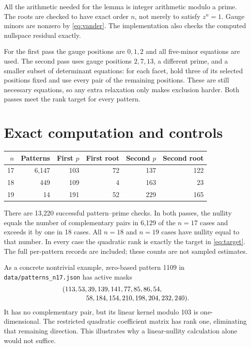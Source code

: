 \documentclass[11pt]{article}
\theoremstyle{definition}
\begin{document}
All the arithmetic needed for the lemma is integer arithmetic modulo a prime. The roots are checked to have exact order $n$, not merely to satisfy $z^n=1$. Gauge minors are nonzero by \eqref{eq:vander}. The implementation also checks the computed nullspace residual exactly.

For the first pass the gauge positions are $0,1,2$ and all five-minor equations are used. The second pass uses gauge positions $2,7,13$, a different prime, and a smaller subset of determinant equations: for each facet, hold three of its selected positions fixed and use every pair of the remaining positions. These are still necessary equations, so any extra relaxation only makes exclusion harder. Both passes meet the rank target for every pattern.

\section{Exact computation and controls}
\begin{center}
\begin{tabular}{rrrrrr}
\toprule
$n$&Patterns&First $p$&First root&Second $p$&Second root\\\midrule
17&6,147&103&72&137&122\\
18&449&109&4&163&23\\
19&14&191&52&229&165\\\bottomrule
\end{tabular}
\end{center}
There are 13,220 successful pattern--prime checks. In both passes, the nullity equals the number of complementary pairs in 6,129 of the $n=17$ cases and exceeds it by one in 18 cases. All $n=18$ and $n=19$ cases have nullity equal to that number. In every case the quadratic rank is exactly the target in \eqref{eq:target}. The full per-pattern records are included; these counts are not sampled estimates.

As a concrete nontrivial example, zero-based pattern 1109 in \texttt{data/patterns\_n17.json} has active masks
\[
\begin{split}
 &(113,53,39,139,141,77,85,86,54,\\[-2pt]
 &\hspace{3.5em}58,184,154,210,198,204,232,240).
\end{split}
\]
It has no complementary pair, but its linear kernel modulo 103 is one-dimensional. The restricted quadratic coefficient matrix has rank one, eliminating that remaining direction. This illustrates why a linear-nullity calculation alone would not suffice.
\end{document}
